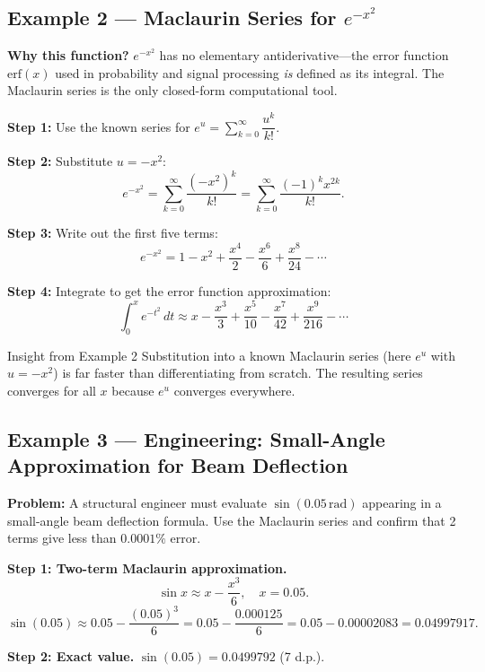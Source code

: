 \documentclass[12pt,a4paper]{article}
\begin{document}
\subsection*{Example 2 --- Maclaurin Series for \(e^{-x^2}\)}

\textbf{Why this function?} \(e^{-x^2}\) has no elementary antiderivative---the error function
\(\mathrm{erf}(x)\) used in probability and signal processing \emph{is} defined as its integral.
The Maclaurin series is the only closed-form computational tool.

\textbf{Step 1:} Use the known series for \(e^u = \sum_{k=0}^{\infty}\dfrac{u^k}{k!}\).

\textbf{Step 2:} Substitute \(u = -x^2\):
\[
  e^{-x^2} = \sum_{k=0}^{\infty} \frac{(-x^2)^k}{k!}
           = \sum_{k=0}^{\infty} \frac{(-1)^k x^{2k}}{k!}.
\]

\textbf{Step 3:} Write out the first five terms:
\[
  e^{-x^2} = 1 - x^2 + \frac{x^4}{2} - \frac{x^6}{6} + \frac{x^8}{24} - \cdots
\]

\textbf{Step 4:} Integrate to get the error function approximation:
\[
  \int_0^x e^{-t^2}\,dt \approx x - \frac{x^3}{3} + \frac{x^5}{10} - \frac{x^7}{42}
                               + \frac{x^9}{216} - \cdots
\]

\begin{learnbox}{Insight from Example 2}
Substitution into a known Maclaurin series (here \(e^u\) with \(u=-x^2\)) is
far faster than differentiating from scratch.
The resulting series converges for all \(x\) because \(e^u\) converges
everywhere.
\end{learnbox}

\subsection*{Example 3 --- Engineering: Small-Angle Approximation for Beam Deflection}

\textbf{Problem:} A structural engineer must evaluate \(\sin(0.05\,\text{rad})\) appearing in a
small-angle beam deflection formula.
Use the Maclaurin series and confirm that 2 terms give less than \(0.0001\%\) error.

\textbf{Step 1: Two-term Maclaurin approximation.}
\[
  \sin x \approx x - \frac{x^3}{6}, \quad x = 0.05.
\]
\[
  \sin(0.05) \approx 0.05 - \frac{(0.05)^3}{6}
             = 0.05 - \frac{0.000125}{6}
             = 0.05 - 0.00002083
             = 0.04997917.
\]

\textbf{Step 2: Exact value.}
\(\sin(0.05) = 0.0499792\) (7 d.p.).
\end{document}

